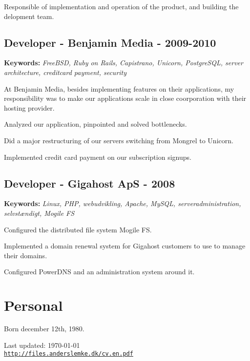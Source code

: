 \documentclass[a4paper]{article}
\renewenvironment{itemize}{
  \begin{list}{}
    { \setlength{\itemsep}{5pt}
      \setlength{\parsep}{0pt}
      \setlength{\topsep}{0pt}
      \setlength{\leftmargin}{0em} } }{
  \end{list}}
\newcommand{\keywords}[1]{\small\textbf{Keywords:} \emph{#1}\normalsize}
\begin{document}
Responsible of implementation and operation of the product, and building the delopment team.

\subsection*{Developer - Benjamin Media - 2009-2010}
\keywords{FreeBSD, Ruby on Rails, Capistrano, Unicorn, PostgreSQL, server architecture, creditcard payment, security}

At Benjamin Media, besides implementing features on their applications, my responsibility was to make our applications scale in close coorporation with their hosting provider.

\begin{itemize}
  \item Analyzed our application, pinpointed and solved bottlenecks.
  \item Did a major restructuring of our servers switching from Mongrel to Unicorn.
  \item Implemented credit card payment on our subscription signups.
\end{itemize}

\subsection*{Developer - Gigahost ApS - 2008}

\keywords{Linux, PHP, webudvikling, Apache, MySQL, serveradministration, selvstændigt, Mogile FS}

\begin{itemize}
  \item Configured the distributed file system Mogile FS.
  \item Implemented a domain renewal system for Gigahost customers to use to manage their domains.
  \item Configured PowerDNS and an administration system around it.
\end{itemize}

\section*{Personal}
Born december 12th, 1980.

\bigskip

\begin{center}
  \begin{footnotesize}
    Last updated: \today \\
    \href{http://files.anderslemke.dk/cv.en.pdf}{\tt http://files.anderslemke.dk/cv.en.pdf}
  \end{footnotesize}
\end{center}
\end{document}
